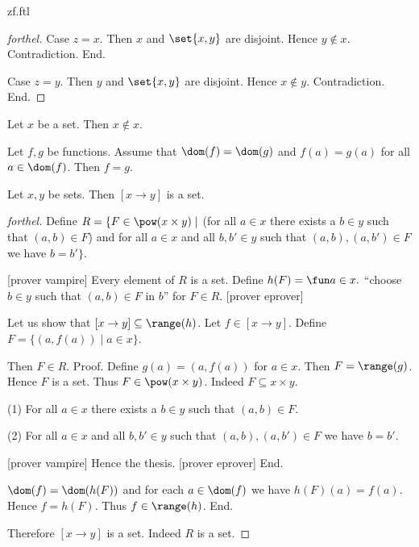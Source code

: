 \documentclass{naproche-library}
\begin{document}
\begin{smodule}{zf.ftl}
\begin{proof}[forthel]
    Case $z = x$.
      Then $x$ and $\set{x,y}$ are disjoint.
      Hence $y \notin x$.
      Contradiction.
    End.

    Case $z = y$.
      Then $y$ and $\set{x,y}$ are disjoint.
      Hence $x \notin y$.
      Contradiction.
    End.
  \end{proof}

  \begin{corollary}[forthel,id=FOUNDATIONS_10_3086917813927936]
    Let $x$ be a set.
    Then $x \notin x$.
  \end{corollary}

  \begin{proposition}[forthel,id=FOUNDATIONS_10_4589652321021547]
    Let $f, g$ be functions.
    Assume that $\dom(f) = \dom(g)$ and $f(a) = g(a)$ for all $a \in \dom(f)$.
    Then $f = g$.
  \end{proposition}

  \begin{proposition}[forthel,id=FOUNDATIONS_10_4105036244189184]
    Let $x, y$ be sets.
    Then $[x \to y]$ is a set.
  \end{proposition}
  \begin{proof}[forthel]
    Define $R = \{ F \in \pow(x \times y) \mid$ (for all $a \in x$ there exists a $b \in y$ such that $(a,b) \in F$) and for all $a \in x$ and all $b, b' \in y$ such that $(a,b), (a,b') \in F$ we have $b = b' \}$.

    [prover vampire]
    Every element of $R$ is a set. %
    Define $h(F) = \fun a \in x.$ ``choose $b \in y$ such that $(a,b) \in F$ in $b$'' for $F \in R$.
    [prover eprover]

    Let us show that $[x \to y] \subseteq \range(h)$.
      Let $f \in [x \to y]$.
      Define $F = \{ (a,f(a)) \mid a \in x \}$.

      Then $F \in R$. \newline
      Proof.
        Define $g(a) = (a,f(a))$ for $a \in x$.
        Then $F = \range(g)$.
        Hence $F$ is a set.
        Thus $F \in \pow(x \times y)$.
        Indeed $F \subseteq x \times y$.

        (1) For all $a \in x$ there exists a $b \in y$ such that $(a,b) \in F$.

        (2) For all $a \in x$ and all $b, b' \in y$ such that $(a,b),
        (a,b') \in F$ we have $b = b'$.

        [prover vampire]
        Hence the thesis.
        [prover eprover]
      End.

      $\dom(f) = \dom(h(F))$ and for each $a \in \dom(f)$ we have $h(F)(a) = f(a)$.
      Hence $f = h(F)$.
      Thus $f \in \range(h)$.
    End.

    Therefore $[x \to y]$ is a set.
    Indeed $R$ is a set.
  \end{proof}
\end{smodule}
\end{document}
